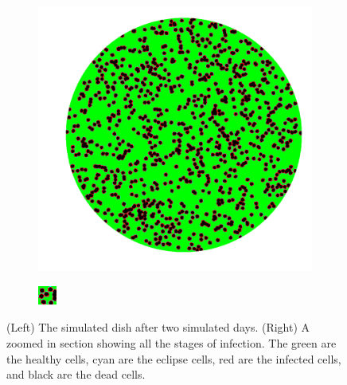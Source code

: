 \documentclass[a4paper]{article}
\begin{document}
\begin{figure}[h]
    \centering
    \begin{subfigure}[b]{0.4\linewidth}
        \includegraphics[width=\linewidth]{Figures/EclipseCells.pdf}
        \caption{}
        \label{fig:Dish}
    \end{subfigure}
    \begin{subfigure}[b]{0.4\linewidth}
        \includegraphics[width=\linewidth]{Figures/ZoomEclipseCells.pdf}
        \caption{}
        \label{fig:ZoomedInEclipse}
    \end{subfigure}
    \caption{(Left) The simulated dish after two simulated days. (Right) A zoomed in section showing all the stages of infection. The green are the healthy cells, cyan are the eclipse cells, red are the infected cells, and black are the dead cells.}
    \label{fig:EclipseCells}
\end{figure}
\end{document}
